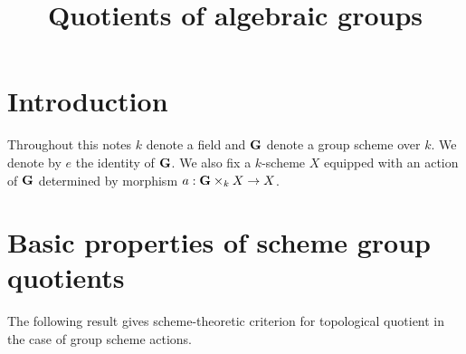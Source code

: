 



\title{Quotients of algebraic groups}
\date{}
\maketitle

\section{Introduction}
\noindent
Throughout this notes $k$ denote a field and $\mathbf{G}$ denote a group scheme over $k$. We denote by $e$ the identity of $\mathbf{G}$. We also fix a $k$-scheme $X$ equipped with an action of $\mathbf{G}$ determined by morphism $a:\mathbf{G}\times_kX\rightarrow X$.

\section{Basic properties of scheme group quotients}
\noindent
The following result gives scheme-theoretic criterion for topological quotient in the case of group scheme actions.

